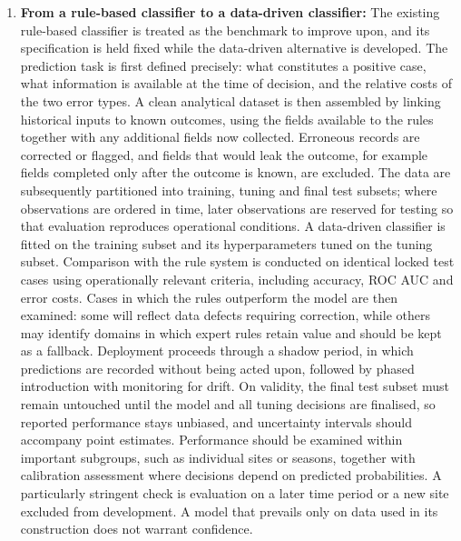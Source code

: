 \documentclass[conference]{IEEEtran}
\begin{document}
\begin{enumerate}
    \item \textbf{From a rule-based classifier to a data-driven classifier:} The existing rule-based classifier is treated as the benchmark to improve upon, and its specification is held fixed while the data-driven alternative is developed. The prediction task is first defined precisely: what constitutes a positive case, what information is available at the time of decision, and the relative costs of the two error types. A clean analytical dataset is then assembled by linking historical inputs to known outcomes, using the fields available to the rules together with any additional fields now collected. Erroneous records are corrected or flagged, and fields that would leak the outcome, for example fields completed only after the outcome is known, are excluded. The data are subsequently partitioned into training, tuning and final test subsets; where observations are ordered in time, later observations are reserved for testing so that evaluation reproduces operational conditions. A data-driven classifier is fitted on the training subset and its hyperparameters tuned on the tuning subset. Comparison with the rule system is conducted on identical locked test cases using operationally relevant criteria, including accuracy, ROC AUC and error costs. Cases in which the rules outperform the model are then examined: some will reflect data defects requiring correction, while others may identify domains in which expert rules retain value and should be kept as a fallback. Deployment proceeds through a shadow period, in which predictions are recorded without being acted upon, followed by phased introduction with monitoring for drift. On validity, the final test subset must remain untouched until the model and all tuning decisions are finalised, so reported performance stays unbiased, and uncertainty intervals should accompany point estimates. Performance should be examined within important subgroups, such as individual sites or seasons, together with calibration assessment where decisions depend on predicted probabilities. A particularly stringent check is evaluation on a later time period or a new site excluded from development. A model that prevails only on data used in its construction does not warrant confidence.


\end{enumerate}
\end{document}
